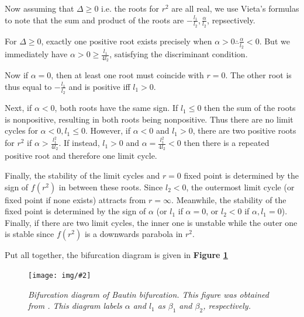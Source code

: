 \documentclass[letterpaper,12pt]{article}
\numberwithin{table}{section}
\numberwithin{figure}{section}
\numberwithin{equation}{section}
\newcommand{\centerfig}[2]{\begin{center}\texttt{[image: img/\#2]}\end{center}}
\newcommand{\ccaption}[1]{\caption{\textit{#1}}}
\newcommand{\reffig}[1]{\textbf{Figure \ref{#1}}}
\begin{document}
\begin{flushleft}
    Now assuming that $\Delta \geq 0$ i.e. the roots for $r^2$ are all real, we use Vieta's formulas to note that the sum and product of the roots are $-\frac{l_1}{l_2}, \frac{\alpha}{l_2}$, repsectively.
    
    For $\Delta \geq 0$, exactly one positive root exists precisely when $\alpha > 0 \therefore \frac{\alpha}{l_2} < 0$. But we immediately have $\alpha > 0 \geq \frac{l_1}{4l_2}$, satisfying the discriminant condition.

    Now if $\alpha = 0$, then at least one root must coincide with $r = 0$. The other root is thus equal to $-\frac{l_1}{l_2}$ and is positive iff $l_1 > 0$.

    Next, if $\alpha < 0$, both roots have the same sign. If $l_1 \leq 0$ then the sum of the roots is nonpositive, resulting in both roots being nonpositive. Thus there are no limit cycles for $\alpha < 0, l_1 \leq 0$. However, if $\alpha < 0$ and $l_1 > 0$, there are two positive roots for $r^2$ if $\alpha > \frac{l_1^2}{4l_2}$. If instead, $l_1 > 0$ and $\alpha = \frac{l_1^2}{4l_2} < 0$ then there is a repeated positive root and therefore one limit cycle.

    Finally, the stability of the limit cycles and $r = 0$ fixed point is determined by the sign of $f(r^2)$ in between these roots. Since $l_2 < 0$, the outermost limit cycle (or fixed point if none exists) attracts from $r = \infty$. Meanwhile, the stability of the fixed point is determined by the sign of $\alpha$ (or $l_1$ if $\alpha = 0$, or $l_2 < 0$ if $\alpha, l_1 = 0$). Finally, if there are two limit cycles, the inner one is unstable while the outer one is stable since $f(r^2)$ is a downwards parabola in $r^2$.

    Put all together, the bifurcation diagram is given in \reffig{fig:bautin}
    \begin{figure}[h]

        \centering
    
        \centerfig{0.65}{bautin.jpg}

        \captionsetup{width=0.8\linewidth}
        \ccaption{Bifurcation diagram of Bautin bifurcation. This figure was obtained from \cite{kuznetsov}. This diagram labels $\alpha$ and $l_1$ as $\beta_1$ and $\beta_2$, respectively.}
    
        \label{fig:bautin}
    
    \end{figure}


\end{flushleft}
\end{document}
